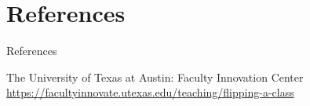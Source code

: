 \documentclass[xcolor=table]{beamer}
\begin{document}
\section*{References}

\begin{frame}[allowframebreaks]{References}
    
  \begin{thebibliography}{10}

  	The University of Texas at Austin: \small
  	Faculty Innovation Center
    \newblock  \small \url{https://facultyinnovate.utexas.edu/teaching/flipping-a-class}
 
  \end{thebibliography}
\end{frame}
\end{document}
